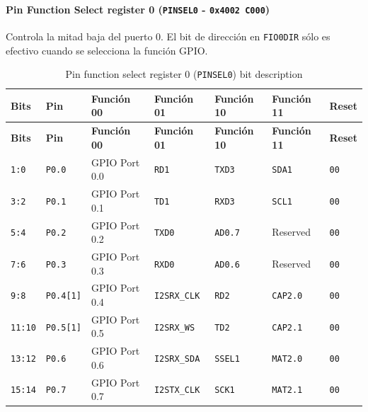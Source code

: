\paragraph{Pin Function Select register 0 (\texttt{PINSEL0} - \texttt{0x4002 C000})}
Controla la mitad baja del puerto 0. El bit de dirección en \texttt{FIO0DIR} sólo es efectivo cuando se selecciona la función GPIO.

\begin{longtable}{|>{\raggedright\arraybackslash}p{}|>{\raggedright\arraybackslash}p{}|>{\raggedright\arraybackslash}p{}|>{\raggedright\arraybackslash}p{}|>{\raggedright\arraybackslash}p{}|>{\raggedright\arraybackslash}p{}|>{\centering\arraybackslash}p{}|}
\caption{Pin function select register 0 (\texttt{PINSEL0}) bit description}\\
\hline
\textbf{Bits} & \textbf{Pin} & \textbf{Función 00} & \textbf{Función 01} & \textbf{Función 10} & \textbf{Función 11} & \textbf{Reset} \\
\hline
\endfirsthead
\hline
\textbf{Bits} & \textbf{Pin} & \textbf{Función 00} & \textbf{Función 01} & \textbf{Función 10} & \textbf{Función 11} & \textbf{Reset} \\
\hline
\endhead
\texttt{1:0} & \texttt{P0.0} & GPIO Port 0.0 & \texttt{RD1} & \texttt{TXD3} & \texttt{SDA1} & \texttt{00} \\
\hline
\texttt{3:2} & \texttt{P0.1} & GPIO Port 0.1 & \texttt{TD1} & \texttt{RXD3} & \texttt{SCL1} & \texttt{00} \\
\hline
\texttt{5:4} & \texttt{P0.2} & GPIO Port 0.2 & \texttt{TXD0} & \texttt{AD0.7} & Reserved & \texttt{00} \\
\hline
\texttt{7:6} & \texttt{P0.3} & GPIO Port 0.3 & \texttt{RXD0} & \texttt{AD0.6} & Reserved & \texttt{00} \\
\hline
\texttt{9:8} & \texttt{P0.4[1]} & GPIO Port 0.4 & \texttt{I2SRX\_CLK} & \texttt{RD2} & \texttt{CAP2.0} & \texttt{00} \\
\hline
\texttt{11:10} & \texttt{P0.5[1]} & GPIO Port 0.5 & \texttt{I2SRX\_WS} & \texttt{TD2} & \texttt{CAP2.1} & \texttt{00} \\
\hline
\texttt{13:12} & \texttt{P0.6} & GPIO Port 0.6 & \texttt{I2SRX\_SDA} & \texttt{SSEL1} & \texttt{MAT2.0} & \texttt{00} \\
\hline
\texttt{15:14} & \texttt{P0.7} & GPIO Port 0.7 & \texttt{I2STX\_CLK} & \texttt{SCK1} & \texttt{MAT2.1} & \texttt{00} \\

\end{longtable}
